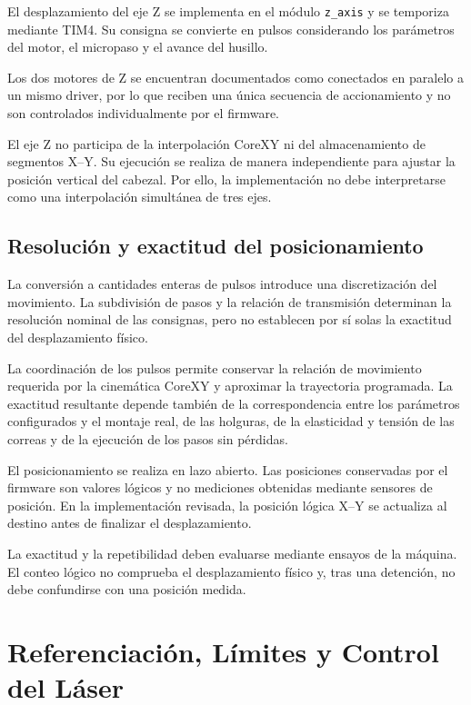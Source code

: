 \documentclass[blue,fullpaper]{ludusofficial}  %
\begin{document}
El desplazamiento del eje Z se implementa
en el módulo \texttt{z\_axis} y se temporiza
mediante TIM4. Su consigna se convierte
en pulsos considerando los parámetros
del motor, el micropaso y el avance del husillo.

Los dos motores de Z se encuentran documentados
como conectados en paralelo a un mismo driver,
por lo que reciben una única secuencia
de accionamiento y no son controlados
individualmente por el firmware.

El eje Z no participa de la interpolación CoreXY
ni del almacenamiento de segmentos X--Y.
Su ejecución se realiza de manera independiente
para ajustar la posición vertical del cabezal.
Por ello, la implementación no debe interpretarse
como una interpolación simultánea de tres ejes.

\subsection{Resolución y exactitud del posicionamiento}

La conversión a cantidades enteras de pulsos
introduce una discretización del movimiento.
La subdivisión de pasos y la relación de transmisión
determinan la resolución nominal de las consignas,
pero no establecen por sí solas la exactitud
del desplazamiento físico.

La coordinación de los pulsos permite conservar
la relación de movimiento requerida por la
cinemática CoreXY y aproximar la trayectoria
programada. La exactitud resultante depende
también de la correspondencia entre los parámetros
configurados y el montaje real, de las holguras,
de la elasticidad y tensión de las correas
y de la ejecución de los pasos sin pérdidas.

El posicionamiento se realiza en lazo abierto.
Las posiciones conservadas por el firmware
son valores lógicos y no mediciones obtenidas
mediante sensores de posición. En la implementación
revisada, la posición lógica X--Y se actualiza
al destino antes de finalizar el desplazamiento.

La exactitud y la repetibilidad deben evaluarse mediante ensayos de la máquina. El conteo lógico no comprueba el desplazamiento físico y, tras una detención, no debe confundirse con una posición medida.


\section{Referenciación, Límites y Control del Láser}
\label{sec:referenciacion-laser}
\end{document}
